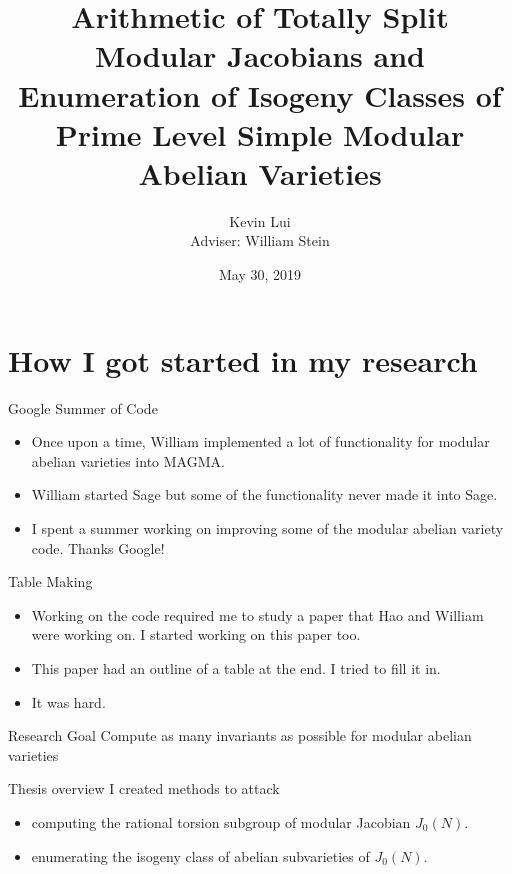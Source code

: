 \documentclass{beamer}
\title{%
    Arithmetic of Totally Split Modular Jacobians and Enumeration of Isogeny
    Classes of Prime Level Simple Modular Abelian Varieties
}
\author{Kevin Lui\\Adviser: William Stein}
\date{May 30, 2019}
\institute{Final Exam}
\begin{document}
\frame{\titlepage}

\section{How I got started in my research}

\begin{frame}{Google Summer of Code}
    \begin{itemize}
        \item
            Once upon a time, William implemented a lot of functionality
            for modular abelian varieties into MAGMA.
        \item
            William started Sage but some of the functionality never made it
            into Sage.
        \item
            I spent a summer working on improving some of the modular abelian
            variety code. Thanks Google!
    \end{itemize}
\end{frame}

\begin{frame}{Table Making}
    \begin{itemize}
        \item
            Working on the code required me to study a paper that Hao and
            William were working on. I started working on this paper too.
        \item
            This paper had an outline of a table at the end. I tried to fill it
            in.
        \item
            It was hard.
   \end{itemize}
\end{frame}

\begin{frame}{Research Goal}
    \Huge{Compute as many invariants as possible for modular abelian
    varieties}
\end{frame}

\begin{frame}{Thesis overview}
    I created methods to attack
    \begin{itemize}
        \item
            computing the rational torsion subgroup of modular
            Jacobian $J_0(N)$.
        \item
            enumerating the isogeny class of abelian subvarieties of
            $J_0(N)$.
    \end{itemize}
\end{frame}
\end{document}
